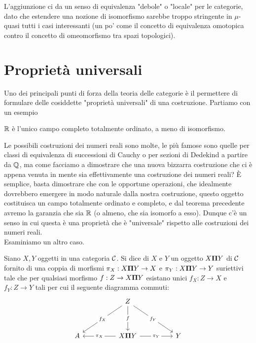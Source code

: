 \documentclass{article}
\begin{document}
L'aggiunzione ci da un senso di equivalenza "debole" o "locale" per le categorie, dato che estendere una nozione di isomorfismo sarebbe troppo stringente in $\mu$-quasi tutti i casi interessanti (un po' come il concetto di equivalenza omotopica contro il concetto di omeomorfismo tra spazi topologici).

\section{Proprietà universali}
\label{sec:Universal}

Uno dei principali punti di forza della teoria delle categorie è il permettere di formulare delle cosiddette "proprietà universali" di una costruzione. Partiamo con un esempio

\begin{theorem}
    $\mathbb{R}$ è l'unico campo completo totalmente ordinato, a meno di isomorfismo.\cite{Huntington1903}
\end{theorem}

Le possibili costruzioni dei numeri reali sono molte, le più famose sono quelle per classi di equivalenza di successioni di Cauchy o per sezioni di Dedekind a partire da $\mathbb{Q}$, ma come facciamo a dimostrare che una nuova bizzarra costruzione che ci è appena venuta in mente sia effettivamente una costruzione dei numeri reali? È semplice, basta dimostrare che con le opportune operazioni, che idealmente dovrebbero emergere in modo naturale dalla nostra costruzione, questo oggetto costituisca un campo totalmente ordinato e completo, e dal teorema precedente avremo la garanzia che sia $\mathbb{R}$ (o almeno, che sia isomorfo a esso). Dunque c'è un senso in cui questa è una proprietà che è "universale" rispetto alle costruzioni dei numeri reali.\\ Esaminiamo un altro caso.

\begin{definition}
    Siano $X,Y$ oggetti in una categoria $\mathcal{C}$. Si dice  di $X$ e $Y$ un oggetto $X \mathbf{\Pi} Y$ di $\mathcal{C}$ fornito di una coppia di morfismi $\pi_X: X \mathbf{\Pi} Y \to X$ e $\pi_Y : X \mathbf{\Pi} Y \to Y$ suriettivi tale che per qualsiasi morfismo $f:Z\to X \mathbf{\Pi} Y$ esistano unici $f_X: Z \to X$ e $f_Y : Z\to Y$ tali per cui il seguente diagramma commuti: 
    \[\begin{tikzcd}
	    && Z \\
	    \\
	    A && {X \cattimes Y} && Y
	    \arrow["f"{description}, from=1-3, to=3-3]
	    \arrow["{\pi_X}"{description}, from=3-3, to=3-1]
	    \arrow["{f_X}"{description}, from=1-3, to=3-1]
	    \arrow["{f_Y}"{description}, from=1-3, to=3-5]
	    \arrow["{\pi_Y}"{description}, from=3-3, to=3-5]
    \end{tikzcd}\]
\end{definition}
\end{document}
